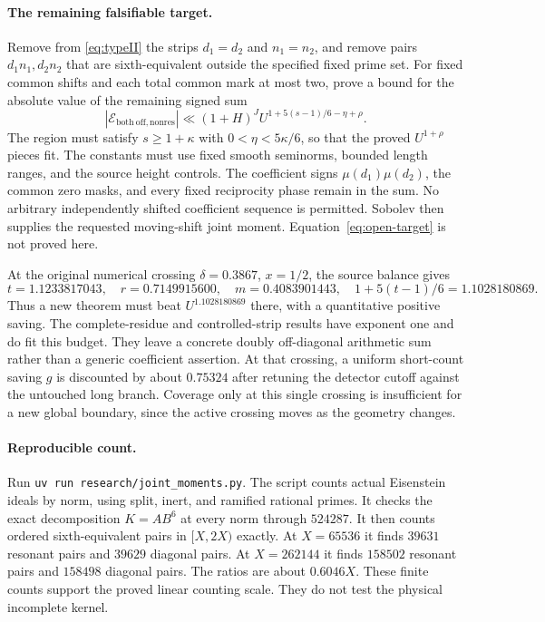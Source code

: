 \documentclass[11pt]{article}
\begin{document}
\paragraph{The remaining falsifiable target.}
Remove from \eqref{eq:typeII} the strips $d_1=d_2$ and $n_1=n_2$,
and remove pairs $d_1n_1,d_2n_2$ that are sixth-equivalent outside
the specified fixed prime set. For fixed common shifts and each total
common mark at most two, prove a bound for the absolute value of the
remaining signed sum
\begin{equation}\label{eq:open-target}
 |\mathcal E_{\mathrm{both\ off,nonres}}|
 \ll (1+H)^J U^{1+5(s-1)/6-\eta+\rho}.
\end{equation}
The region must satisfy $s\ge1+\kappa$ with
$0<\eta<5\kappa/6$, so that the proved $U^{1+\rho}$ pieces fit.
The constants must use fixed smooth seminorms, bounded length ranges,
and the source height controls. The coefficient signs $\mu(d_1)\mu(d_2)$,
the common zero masks, and every fixed reciprocity phase remain in the sum.
No arbitrary independently shifted coefficient sequence is permitted.
Sobolev then supplies the requested moving-shift joint moment.
Equation~\eqref{eq:open-target} is not proved here.

At the original numerical crossing
$\delta=0.3867$, $x=1/2$, the source balance gives
\[
 t=1.1233817043,\quad r=0.7149915600,\quad m=0.4083901443,
 \quad 1+5(t-1)/6=1.1028180869.
\]
Thus a new theorem must beat $U^{1.1028180869}$ there, with a quantitative
positive saving. The complete-residue and controlled-strip results have
exponent one and do fit this budget. They leave a concrete doubly
off-diagonal arithmetic sum rather than a generic coefficient assertion.
At that crossing, a uniform short-count saving $g$ is discounted by about
$0.75324$ after retuning the detector cutoff against the untouched long
branch. Coverage only at this single crossing is insufficient for a new
global boundary, since the active crossing moves as the geometry changes.

\paragraph{Reproducible count.}
Run \texttt{uv run research/joint\_moments.py}.
The script counts actual Eisenstein ideals by norm, using split,
inert, and ramified rational primes. It checks the exact decomposition
$K=A B^6$ at every norm through $524287$.
It then counts ordered sixth-equivalent pairs in $[X,2X)$ exactly.
At $X=65536$ it finds $39631$ resonant pairs and $39629$ diagonal pairs.
At $X=262144$ it finds $158502$ resonant pairs and $158498$ diagonal pairs.
The ratios are about $0.6046X$. These finite counts support the proved
linear counting scale. They do not test the physical incomplete kernel.
\end{document}
